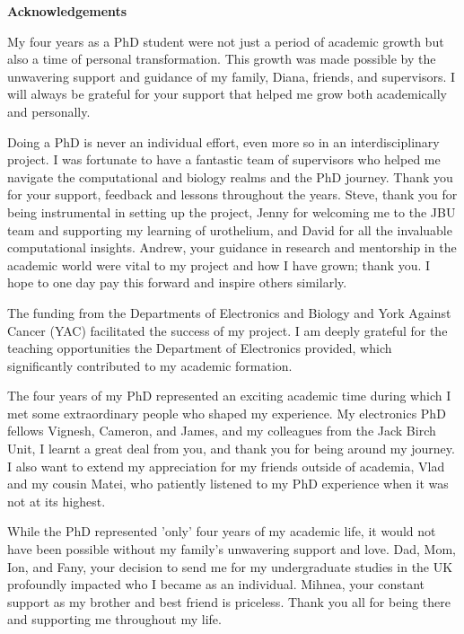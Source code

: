 \thispagestyle{plain}
\begin{center}
    \Large        
    \textbf{Acknowledgements}
    \vspace{0.8cm}

\end{center}
 

My four years as a PhD student were not just a period of academic growth but also a time of personal transformation. This growth was made possible by the unwavering support and guidance of my family, Diana, friends, and supervisors. I will always be grateful for your support that helped me grow both academically and personally.

Doing a PhD is never an individual effort, even more so in an interdisciplinary project. I was fortunate to have a fantastic team of supervisors who helped me navigate the computational and biology realms and the PhD journey. Thank you for your support, feedback and lessons throughout the years. Steve, thank you for being instrumental in setting up the project, Jenny for welcoming me to the JBU team and supporting my learning of urothelium, and David for all the invaluable computational insights. Andrew, your guidance in research and mentorship in the academic world were vital to my project and how I have grown; thank you. I hope to one day pay this forward and inspire others similarly.

The funding from the Departments of Electronics and Biology and York Against Cancer (YAC) facilitated the success of my project. I am deeply grateful for the teaching opportunities the Department of Electronics provided, which significantly contributed to my academic formation.

The four years of my PhD represented an exciting academic time during which I met some extraordinary people who shaped my experience. My electronics PhD fellows Vignesh, Cameron, and James, and my colleagues from the Jack Birch Unit, I learnt a great deal from you, and thank you for being around my journey. I also want to extend my appreciation for my friends outside of academia, Vlad and my cousin Matei, who patiently listened to my PhD experience when it was not at its highest.

While the PhD represented 'only' four years of my academic life, it would not have been possible without my family's unwavering support and love. Dad, Mom, Ion, and Fany, your decision to send me for my undergraduate studies in the UK profoundly impacted who I became as an individual. Mihnea, your constant support as my brother and best friend is priceless. Thank you all for being there and supporting me throughout my life.


